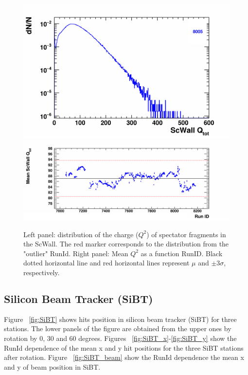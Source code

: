     \begin{figure}[H]
        \begin{center}
            \includegraphics[width=0.35\linewidth]{../pict/QA_RunByRun_24.12/H1/nVtxTr_h2_RunId_scwall_q.png}
            \includegraphics[width=0.60\linewidth]{../pict/QA_RunByRun_24.12/nVtxTr_h2_RunId_scwall_q.png}
            \vspace{-3mm}
            \caption{Left panel: distribution of the charge ($Q^2$) of spectator fragments in the ScWall. The red marker corresponds to the distribution from the "outlier" RunId. Right panel: Mean $Q^2$ as a function RunID. Black dotted horizontal line and red horizontal lines represent $\mu$ and $\pm3\sigma$, respectively.}
            \label{fig:ScWall}
        \end{center}
        \vspace{-5mm}
    \end{figure}


\subsection{Silicon Beam Tracker (SiBT)}

    Figure ~\ref{fig:SiBT} shows hits position in silicon beam tracker (SiBT) for three stations. 
    The lower panels of the figure are obtained from the upper ones by rotation by 0, 30 and 60 degrees.
    Figures ~\ref{fig:SiBT_x}-\ref{fig:SiBT_y} show the RunId dependence of the mean x and y hit positions for the three SiBT stations after rotation.
    Figure ~\ref{fig:SiBT_beam} show the RunId dependence the mean x and y of beam position in SiBT.

